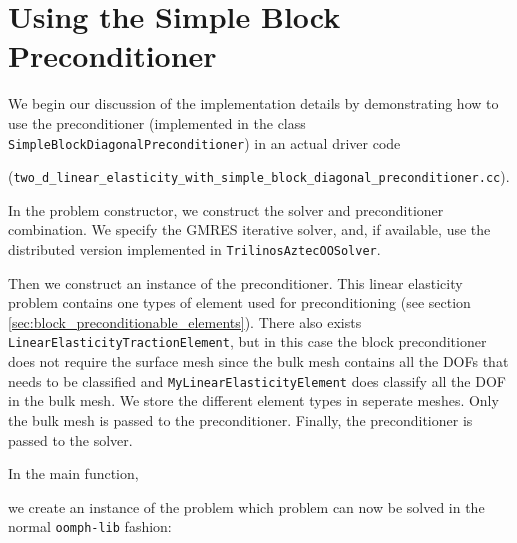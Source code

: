 \section{Using the Simple Block Preconditioner\label{sec:using_the_simple_block_preconditioner}}

We begin our discussion of the implementation details by demonstrating how to use the preconditioner (implemented in the class \verb+SimpleBlockDiagonalPreconditioner+) in an actual driver code 

(\verb+two_d_linear_elasticity_with_simple_block_diagonal_preconditioner.cc+).

In the problem constructor, we construct the solver and preconditioner combination. We specify the GMRES iterative solver, and, if available, use the distributed version implemented in \verb+TrilinosAztecOOSolver+.
\lstset{numberstyle=\scriptsize,breaklines=true, numbers=left, stepnumber=2, frame=single,basicstyle=\ttfamily\scriptsize, showstringspaces=false, language=C++}

Then we construct an instance of the preconditioner. This linear elasticity problem contains one types of element used for preconditioning (see section \ref{sec:block_preconditionable_elements}). There also exists \verb+LinearElasticityTractionElement+, but in this case the block preconditioner does not require the surface mesh since the bulk mesh contains all the DOFs that needs to be classified and \verb+MyLinearElasticityElement+ does classify all the DOF in the bulk mesh. We store
the different element types in seperate meshes. Only the bulk mesh is passed to the preconditioner. Finally, the preconditioner is passed to the 
solver.
\lstset{numberstyle=\scriptsize,breaklines=true, numbers=left, stepnumber=2, frame=single,basicstyle=\ttfamily\scriptsize, showstringspaces=false, language=C++}

In the main function,
\lstset{numberstyle=\scriptsize,breaklines=true, numbers=left, stepnumber=2, frame=single,basicstyle=\ttfamily\scriptsize, showstringspaces=false, language=C++}

we create an instance of the  problem which problem can now be solved in the normal \verb+oomph-lib+ fashion:
\lstset{numberstyle=\scriptsize,breaklines=true, numbers=left, stepnumber=2, frame=single,basicstyle=\ttfamily\scriptsize, showstringspaces=false, language=C++}



